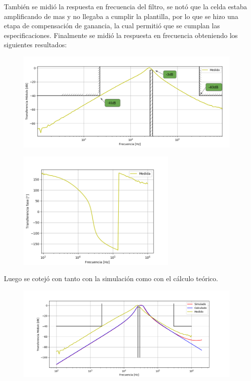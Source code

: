 También se midió la respuesta en frecuencia del filtro, se notó que la celda estaba amplificando de mas y no llegaba a cumplir la plantilla, por lo que se hizo una etapa de compensación de ganancia, la cual permitió que se cumplan las especificaciones. Finalmente se midió la respuesta en frecuencia obteniendo los siguientes resultados:
\begin{figure}[H]
	\centering
	\includegraphics[width=\textwidth]{Imagenes-Ej2/BodeRauch.png}
	\label{fig:graph}
\end{figure}
\begin{figure}[H]
	\centering
	\includegraphics[width=0.7\textwidth]{Imagenes-Ej2/BodeRauchFase.png}
	\label{fig:graph}
\end{figure}
Luego se cotejó con tanto con la simulación como con el cálculo teórico.
\begin{figure}[H]
	\centering
	\includegraphics[width=\textwidth]{Imagenes-Ej2/BodeRauchCalcsim.png}
	\label{fig:Bodecalcsim}
\end{figure}
